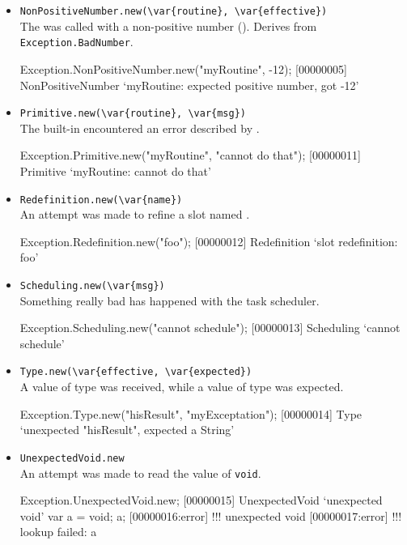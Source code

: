 \begin{itemize}
\item \lstinline|NonPositiveNumber.new(\var{routine}, \var{effective})|\\
  The  was called with a non-positive number
  ().  Derives from \lstinline|Exception.BadNumber|.
\begin{urbiscript}[firstnumber=last]
Exception.NonPositiveNumber.new("myRoutine", -12);
[00000005] NonPositiveNumber `myRoutine: expected positive number, got -12'
\end{urbiscript}

\item \lstinline|Primitive.new(\var{routine}, \var{msg})|\\
  The built-in  encountered an error described by
  .
\begin{urbiscript}[firstnumber=last]
Exception.Primitive.new("myRoutine", "cannot do that");
[00000011] Primitive `myRoutine: cannot do that'
\end{urbiscript}

\item \lstinline|Redefinition.new(\var{name})|\\
  An attempt was made to refine a slot named .
\begin{urbiscript}[firstnumber=last]
Exception.Redefinition.new("foo");
[00000012] Redefinition `slot redefinition: foo'
\end{urbiscript}

\item \lstinline|Scheduling.new(\var{msg})|\\
  Something really bad has happened with the \urbi task scheduler.
\begin{urbiscript}[firstnumber=last]
Exception.Scheduling.new("cannot schedule");
[00000013] Scheduling `cannot schedule'
\end{urbiscript}

\item \lstinline|Type.new(\var{effective, \var{expected})|\\
  A value of type  was received, while a value of type
   was expected.
\begin{urbiscript}[firstnumber=last]
Exception.Type.new("hisResult", "myExceptation");
[00000014] Type `unexpected "hisResult", expected a String'
\end{urbiscript}

\item \lstinline|UnexpectedVoid.new|\\
  An attempt was made to read the value of \lstinline|void|.
\begin{urbiscript}[firstnumber=last]
Exception.UnexpectedVoid.new;
[00000015] UnexpectedVoid `unexpected void'
var a = void;
a;
[00000016:error] !!! unexpected void
[00000017:error] !!! lookup failed: a
\end{urbiscript}

\end{itemize}


